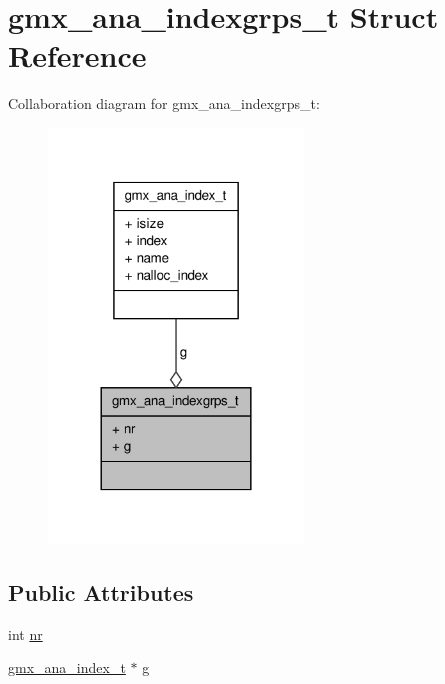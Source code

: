 \hypertarget{structgmx__ana__indexgrps__t}{\section{gmx\-\_\-ana\-\_\-indexgrps\-\_\-t \-Struct \-Reference}
\label{structgmx__ana__indexgrps__t}
}


\-Collaboration diagram for gmx\-\_\-ana\-\_\-indexgrps\-\_\-t\-:
\nopagebreak
\begin{figure}[H]
\begin{center}
\leavevmode
\includegraphics[width=192pt]{structgmx__ana__indexgrps__t__coll__graph}
\end{center}
\end{figure}
\subsection*{\-Public \-Attributes}
\begin{DoxyCompactItemize}
\item 
int \hyperlink{structgmx__ana__indexgrps__t_a99e2f47b1d3e5122125d636f06df51ba}{nr}
\item 
\hyperlink{structgmx__ana__index__t}{gmx\-\_\-ana\-\_\-index\-\_\-t} $\ast$ \hyperlink{structgmx__ana__indexgrps__t_a01062d16d7c0fbbfffd3de0098d367f1}{g}
\end{DoxyCompactItemize}


